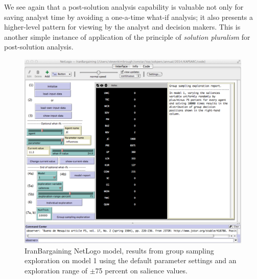 We see again that a post-solution analysis capability is valuable not only for saving analyst time by avoiding a one-a-time what-if analysis; it also presents a higher-level pattern for viewing by the analyst and decision makers. This is another simple instance of application of the principle of \emph{solution pluralism} for post-solution analysis.


\begin{figure}[htbp] %
   \centering
   \includegraphics[width=\textwidth]{chapters/gdp/figures/IranBargainingModel1GroupSamplingExploration.pdf} 
   \caption{IranBargaining NetLogo model, results from group sampling exploration on model 1 using the default parameter settings and an exploration range of $\pm$75 percent on salience values.}
   \label{fig:IranBargainingModel1GroupSamplingExploration}
\end{figure}



